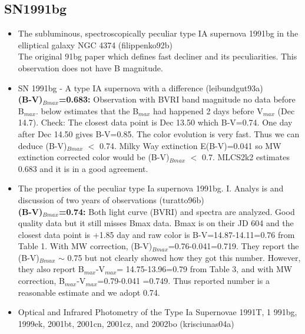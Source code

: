 \subsection{\bf SN1991bg}
\begin{itemize}
\item The subluminous, spectroscopically peculiar type IA supernova 1991bg in the elliptical galaxy NGC 4374  (filippenko92b)
\cite{filippenko92b}\\
The original 91bg paper which defines fast decliner and its peculiarities.
This observation does not have B magnitude.

\item SN 1991bg - A type IA supernova with a difference (leibundgut93a) \cite{leibundgut93a}\\
{\bf (B-V)$_{Bmax}$=0.683:}
Observation with BVRI band magnitude no data before B$_{max}$.  \cite{krisciunas04a} below
estimates that the B$_{max}$ had happened 2 days before V$_{max}$ (Dec 14.7).
Check: The closest data point is Dec 13.50 which B-V=0.74.  One day after Dec 14.50 gives
B-V=0.85.  The color evolution is very fast.  Thus we can deduce (B-V)$_{Bmax}$ $<$ 0.74.
Milky Way extinction E(B-V)=0.041 so MW extinction corrected color would be (B-V)$_{Bmax}$ $<$ 0.7.
MLCS2k2 \cite{jha07a} estimates 0.683 and it is in a good agreement.

\item The properties of the peculiar type Ia supernova 1991bg. I. Analys
is and discussion of two years of observations (turatto96b) \citet{turatto96b}\\
{\bf (B-V)$_{Bmax}$=0.74:}
Both light curve (BVRI) and spectra are analyzed.  Good quality data but it still misses
Bmax data.  Bmax is on their JD 604 and the closest data point is +1.85 day and 
raw color is B-V=14.87-14.11=0.76 from Table 1.  With MW correction, 
(B-V)$_{Bmax}$=0.76-0.041=0.719.  They report the (B-V)$_{Bmax}$ $\sim$ 0.75 but not
clearly showed how they got this number.  However, they also report B$_{max}$-V$_{max}$=
14.75-13.96=0.79 from Table 3, and with MW correction, B$_{max}$-V$_{max}$=0.79-0.041
=0.749.  Thus reported number is a reasonable estimate and we adopt 0.74.  

\item Optical and Infrared Photometry of the Type Ia Supernovae 1991T, 1
991bg, 1999ek, 2001bt, 2001cn, 2001cz, and 2002bo (krisciunas04a) \cite{krisciunas04a}\\
\end{itemize}

